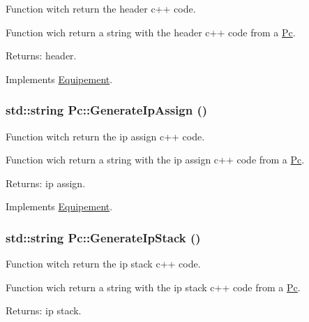 Function witch return the header c++ code. 

Function wich return a string with the header c++ code from a \hyperlink{class_pc}{Pc}.

\begin{Desc}
\item[Returns:]header. \end{Desc}


Implements \hyperlink{class_equipement_136cc8d242b48a665691f8edafa48210}{Equipement}.\hypertarget{class_pc_85794eaecd61612d44e1c68746e1c156}{
\subsubsection[{GenerateIpAssign}]{\setlength{\rightskip}{0pt plus 5cm}std::string Pc::GenerateIpAssign ()}}
\label{class_pc_85794eaecd61612d44e1c68746e1c156}


Function witch return the ip assign c++ code. 

Function wich return a string with the ip assign c++ code from a \hyperlink{class_pc}{Pc}.

\begin{Desc}
\item[Returns:]ip assign. \end{Desc}


Implements \hyperlink{class_equipement_74f771f93374710e8aa42ae17e6b54b4}{Equipement}.\hypertarget{class_pc_6b81e7a8e167ed51f92ce55c0447fefe}{
\subsubsection[{GenerateIpStack}]{\setlength{\rightskip}{0pt plus 5cm}std::string Pc::GenerateIpStack ()}}
\label{class_pc_6b81e7a8e167ed51f92ce55c0447fefe}


Function witch return the ip stack c++ code. 

Function wich return a string with the ip stack c++ code from a \hyperlink{class_pc}{Pc}.

\begin{Desc}
\item[Returns:]ip stack. \end{Desc}


